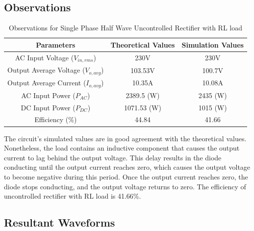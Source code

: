\subsection{Observations}

\begin{table}[h]
    \renewcommand{\arraystretch}{1.3}
    \label{table_observation_2}
    \centering
    \begin{tabular}{|c|c|c|}
        \hline
        Parameters                              & Theoretical Values & Simulation Values \\
        \hline
        \hline
        AC Input Voltage ($ V_{in,rms} $)       & 230V               & 230V              \\
        \hline
        Output Average Voltage ($ V_{o,avg} $)  & 103.53V            & 100.7V            \\
        \hline
        Output Average Current ($ I_{o,avg}  $) & 10.35A             & 10.08A            \\
        \hline
        AC Input Power ($ P_{AC} $)             & 2389.5 (W)         & 2435 (W)          \\
        \hline
        DC Input Power ($ P_{DC} $)             & 1071.53 (W)        & 1015 (W)          \\
        \hline
        Efficiency (\%)                         & 44.84              & 41.66             \\
        \hline
    \end{tabular}
    \caption{Observations for Single Phase Half Wave Uncontrolled Rectifier with RL load}

\end{table}


The circuit's simulated values are in good agreement with the theoretical values. Nonetheless, the load contains an inductive component that causes the output current to lag behind the output voltage. This delay results in the diode conducting until the output current reaches zero, which causes the output voltage to become negative during this period. Once the output current reaches zero, the diode stops conducting, and the output voltage returns to zero.
The efficiency of uncontrolled rectifier with RL load is 41.66\%.
\pagebreak


\subsection{Resultant Waveforms}

